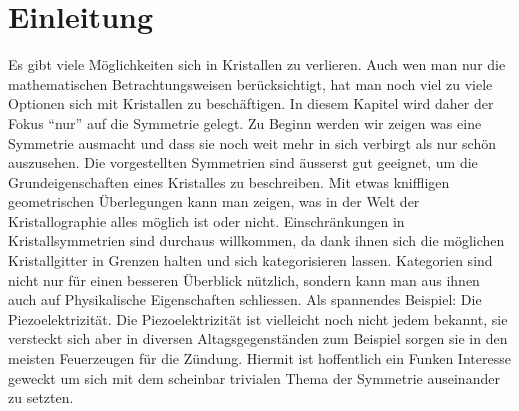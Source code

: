 \section{Einleitung}
Es gibt viele Möglichkeiten sich in Kristallen zu verlieren.
Auch wen man nur die mathematischen Betrachtungsweisen berücksichtigt, 
hat man noch viel zu viele Optionen sich mit Kristallen zu beschäftigen.
In diesem Kapitel wird daher der Fokus ``nur'' auf die Symmetrie gelegt.
Zu Beginn werden wir zeigen was eine Symmetrie ausmacht und 
dass sie noch weit mehr in sich verbirgt als nur schön auszusehen.
Die vorgestellten Symmetrien sind äusserst gut geeignet, 
um die Grundeigenschaften eines Kristalles zu beschreiben.
Mit etwas kniffligen geometrischen Überlegungen kann man zeigen, 
was in der Welt der Kristallographie alles möglich ist oder nicht.
Einschränkungen in Kristallsymmetrien sind durchaus willkommen, 
da dank ihnen sich die möglichen Kristallgitter in Grenzen halten
und sich kategorisieren lassen. 
Kategorien sind nicht nur für einen besseren Überblick nützlich, 
sondern kann man aus ihnen auch auf Physikalische Eigenschaften schliessen. 
Als spannendes Beispiel: Die Piezoelektrizität.
Die Piezoelektrizität ist vielleicht noch nicht jedem bekannt, 
sie versteckt sich aber in diversen Altagsgegenständen 
zum Beispiel sorgen sie in den meisten Feuerzeugen für die Zündung.
Hiermit ist hoffentlich ein Funken Interesse geweckt 
um sich mit dem scheinbar trivialen Thema der Symmetrie auseinander zu setzten.



